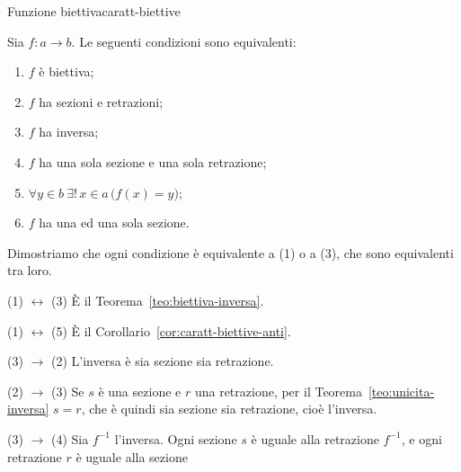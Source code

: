\begin{concetto}
\begin{Teorema}{Funzione biettiva}{caratt-biettive}
    \begin{prerequisiti}
    \end{prerequisiti}
    Sia $f \colon a \to b$. Le seguenti condizioni sono equivalenti:
    \begin{enumerate}
        \item $f$ è biettiva;
        \item $f$ ha sezioni e retrazioni;
        \item $f$ ha inversa;
        \item $f$ ha una sola sezione e una sola retrazione;
        \item $\forall y \in b\ \exists!\, x \in a\,\big(f(x) = y\big)$;
        \item $f$ ha una ed una sola sezione.
    \end{enumerate}
\end{Teorema}
\begin{dimostrazione}
    Dimostriamo che ogni condizione è equivalente a (1) o a (3), che sono equivalenti tra loro.
    \begin{caso}{(1) $\leftrightarrow$ (3)}
        È il Teorema~\ref{teo:biettiva-inversa}.
    \end{caso}
    \begin{caso}{(1) $\leftrightarrow$ (5)}
        È il Corollario~\ref{cor:caratt-biettive-anti}.
    \end{caso}
    \begin{caso}{(3) $\rightarrow$ (2)}
        L'inversa è sia sezione sia retrazione.
    \end{caso}
    \begin{caso}{(2) $\rightarrow$ (3)}
        Se $s$ è una sezione e $r$ una retrazione, per il Teorema~\ref{teo:unicita-inversa} $s = r$, che è quindi sia sezione
        sia retrazione, cioè l'inversa.
    \end{caso}
    \begin{caso}{(3) $\rightarrow$ (4)}
        Sia $f^{-1}$ l'inversa. Ogni sezione $s$ è uguale alla retrazione $f^{-1}$, e ogni retrazione $r$ è uguale alla sezione

\end{caso}
\end{dimostrazione}
\end{concetto}
